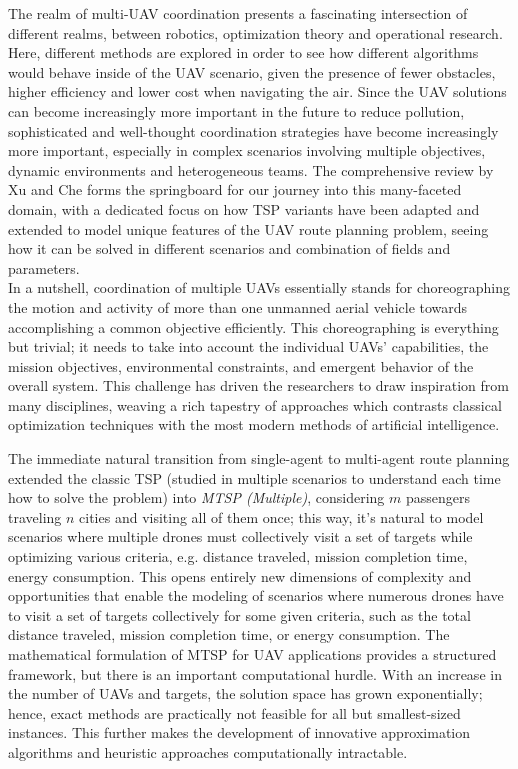 \documentclass[conference]{IEEEtran}
\begin{document}
The realm of multi-UAV coordination presents a fascinating intersection of different realms, between robotics, optimization theory and operational research. Here, different methods are explored in order to see how different algorithms would behave inside of the UAV scenario, given the presence of fewer obstacles, higher efficiency and lower cost when navigating the air. Since the UAV solutions can become increasingly more important in the future to reduce pollution, sophisticated and well-thought coordination strategies have become increasingly more important, especially in complex scenarios involving multiple objectives, dynamic environments and heterogeneous teams. The comprehensive review by Xu and Che \cite{paper2} forms the springboard for our journey into this many-faceted domain, with a dedicated focus on how TSP variants have been adapted and extended to model unique features of the UAV route planning problem, seeing how it can be solved in different scenarios and combination of fields and parameters. \\

In a nutshell, coordination of multiple UAVs essentially stands for choreographing the motion and activity of more than one unmanned aerial vehicle towards accomplishing a common objective efficiently. This choreographing is everything but trivial; it needs to take into account the individual UAVs' capabilities, the mission objectives, environmental constraints, and emergent behavior of the overall system. This challenge has driven the researchers to draw inspiration from many disciplines, weaving a rich tapestry of approaches which contrasts classical optimization techniques with the most modern methods of artificial intelligence. 

The immediate natural transition from single-agent to multi-agent route planning extended the classic TSP (studied in multiple scenarios to understand each time how to solve the problem) into \textit{MTSP (Multiple)}, considering $m$ passengers traveling $n$ cities and visiting all of them once; this way, it's natural to model scenarios where multiple drones must collectively visit a set of targets while optimizing various criteria, e.g. distance traveled, mission completion time, energy consumption. This opens entirely new dimensions of complexity and opportunities that enable the modeling of scenarios where numerous drones have to visit a set of targets collectively for some given criteria, such as the total distance traveled, mission completion time, or energy consumption.
The mathematical formulation of MTSP for UAV applications provides a structured framework, but there is an important computational hurdle. With an increase in the number of UAVs and targets, the solution space has grown exponentially; hence, exact methods are practically not feasible for all but smallest-sized instances. This further makes the development of innovative approximation algorithms and heuristic approaches computationally intractable. \\
\end{document}
